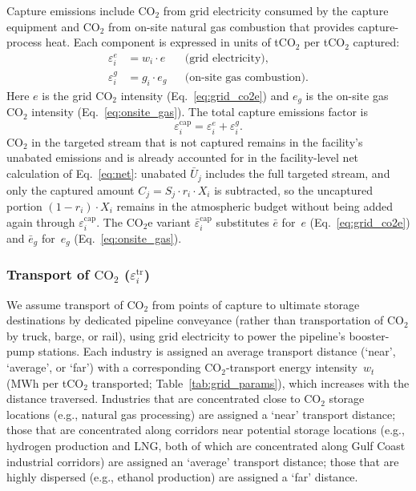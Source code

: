 \documentclass[11pt]{article}
\newcommand{\cotwo}{\ensuremath{\mathrm{CO_2}}}
\newcommand{\cotwoe}{\ensuremath{\mathrm{CO_{2}e}}}
\begin{document}
Capture emissions include \cotwo{} from grid electricity consumed by the capture equipment and \cotwo{} from on-site natural gas combustion that provides capture-process heat. Each component is expressed in units of t\cotwo{} per t\cotwo{} captured:
%
\begin{align}
  \varepsilon_i^{e}
    &= w_i \cdot e
    && \text{(grid electricity),}
  \label{eq:cap_elec} \\
  \varepsilon_i^{g}
    &= g_i \cdot e_g
    && \text{(on-site gas combustion).}
  \label{eq:cap_gas}
\end{align}
%
Here $e$ is the grid \cotwo{} intensity (Eq.~\ref{eq:grid_co2e}) and $e_g$ is the on-site gas \cotwo{} intensity (Eq.~\ref{eq:onsite_gas}).
The total capture emissions factor is
%
\begin{equation}
  \varepsilon_i^{\text{cap}}
    = \varepsilon_i^{e} + \varepsilon_i^{g}.
  \label{eq:cap_total}
\end{equation}
%
\cotwo{} in the targeted stream that is not captured remains in the facility's unabated emissions and is already accounted for in the facility-level net calculation of Eq.~\eqref{eq:net}: unabated $\bar{U}_j$ includes the full targeted stream, and only the captured amount $C_j = S_j \cdot r_i \cdot X_i$ is subtracted, so the uncaptured portion $(1 - r_i) \cdot X_i$ remains in the atmospheric budget without being added again through $\varepsilon_i^{\text{cap}}$. The \cotwoe{} variant $\bar{\varepsilon}_i^{\text{cap}}$ substitutes $\bar{e}$ for~$e$ (Eq.~\ref{eq:grid_co2e}) and $\bar{e}_g$ for~$e_g$ (Eq.~\ref{eq:onsite_gas}).

\subsubsection{Transport of \cotwo{} ($\varepsilon_i^{\text{tr}}$)}
\label{sec:transport}

We assume transport of \cotwo{} from points of capture to ultimate storage destinations by dedicated pipeline conveyance (rather than transportation of \cotwo{} by truck, barge, or rail), using grid electricity to power the pipeline's booster-pump stations. Each industry is assigned an average transport distance (`near', `average', or `far') with a corresponding \cotwo{}-transport energy intensity~$w_t$ (MWh per t\cotwo{} transported; Table~\ref{tab:grid_params}), which increases with the distance traversed. Industries that are concentrated close to \cotwo{} storage locations (e.g., natural gas processing) are assigned a `near' transport distance; those that are concentrated along corridors near potential storage locations (e.g., hydrogen production and LNG, both of which are concentrated along Gulf Coast industrial corridors) are assigned an `average' transport distance; those that are highly dispersed (e.g., ethanol production) are assigned a `far' distance.
\end{document}
